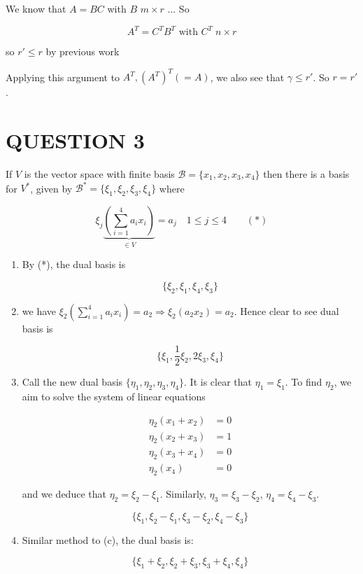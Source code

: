 \documentclass[a4paper]{article}
\begin{document}
We know that $ A = BC $ with $ B $ $ m \times r $ ...
So 

\[ A^{T} = C^{T} B^{T} \text{ with } C^{T} \; n \times r \]

so $ r' \leq r $ by previous work

Applying this argument to $ A^{T}, (A^{T})^{T} (= A) $, we also see that $ \gamma \leq r' $. So $ r = r' $.

 

\section{QUESTION 3}

If $ V $ is the vector space with finite basis $\mathcal{B} =  \{ x_{1},x_{2},x_{3},x_{4} \} $ then there is a basis for $ V^{*} $, given by $ \mathcal{B}^{*} = \{  \xi_{1},\xi_{2},\xi_{3},\xi_{4} \} $ where

\[ \xi_{j}  \underbrace{\left(  \sum_{i=1}^{4} a_{i}x_{i} \right)}_{\in V} = a_{j} \quad 1 \leq j \leq 4 \qquad (*) \]

\begin{enumerate}[label=(\alph*)]
	\item By (*), the dual basis is
	
	\[ \{  \xi_{2}, \xi_{1},\xi_{4},\xi_{3} \} \]
	
	\item we have $ \xi_{2}  \left(  \sum_{i=1}^{4} a_{i}x_{i} \right)  = a_{2} \Rightarrow \xi_{2} (  a_{2}x_{2} ) = a_{2} $. Hence clear to see dual basis is  
	
	\[ \{  \xi_{1}, \frac{1}{2} \xi_{2}, 2 \xi_{3},\xi_{4} \} \]
	
	\item Call the new dual basis $ \{  \eta_{1},\eta_{2},\eta_{3},\eta_{4} \} $. It is clear that $ \eta_{1} = \xi_{1} $. To find $ \eta_{2} $, we aim to solve the system of linear equations
	
	
\begin{align*}
\eta_{2}(x_{1} +x_{2})  & = 0  \\
\eta_{2}(x_{2}+x_{3}) & = 1 \\
\eta_{2}(x_{3} + x_{4}) & = 0 \\
\eta_{2} (x_{4}) & = 0
\end{align*} 


and we deduce that $ \eta_{2} = \xi_{2} - \xi_{1} $. Similarly, $ \eta_{3} = \xi_{3} - \xi_{2} $, $ \eta_{4} = \xi_{4} - \xi_{3} $.

\[ \{  \xi_{1}, \xi_{2} - \xi_{1}, \xi_{3} - \xi_{2}, \xi_{4} - \xi_{3}  \} \]

\item Similar method to (c), the dual basis is:

\[ \{  \xi_{1} + \xi_{2}, \xi_{2} + \xi_{3}, \xi_{3} + \xi_{4}, \xi_{4}  \} \]

\end{enumerate}
\end{document}
